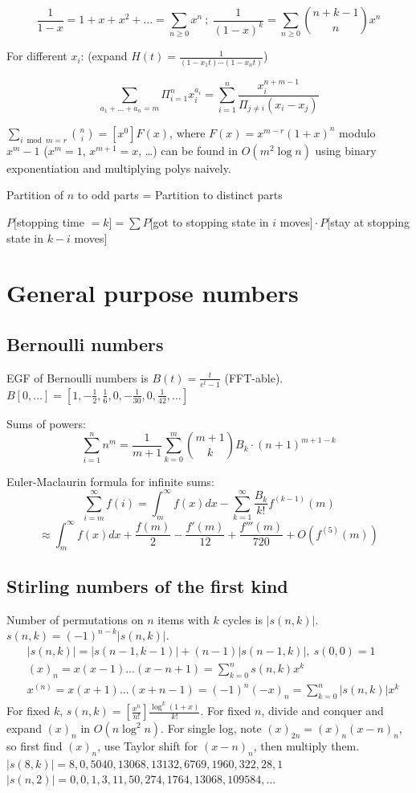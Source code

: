 	$$ \frac{1}{1-x} = 1+x+x^2+\ldots = \sum_{n \ge 0} x^n \ ;\ \frac{1}{(1-x)^k} = \sum_{n \ge 0} \binom{n+k-1}{n} x^n $$

	For different $x_i$: (expand $H(t)=\frac{1}{(1-x_1 t)\cdots (1-x_n t)}$)

	$$ \sum_{a_1+\ldots+a_n=m} \Pi_{i=1}^n x_i ^ {a_i} = \sum_{i=1}^n \frac{x_i ^ {n+m-1}}{\Pi_{j \neq i} (x_i-x_j)} $$

	$\sum_{i \bmod m = r}\binom{n}{i}=[x^0]F(x)$, where $F(x)=x^{m-r}(1+x)^n$ modulo $x^m-1$ ($x^m=1$, $x^{m+1}=x$, \ldots) can be found in $O(m^2 \log n)$ using binary exponentiation and multiplying polys naively.

	Partition of $n$ to odd parts = Partition to distinct parts

	$P[$stopping time $= k] = \sum P[$got to stopping state in $i$ moves$]\cdot P[$stay at stopping state in $k-i$ moves$]$

\columnbreak

\section{General purpose numbers}
	\subsection{Bernoulli numbers}
		EGF of Bernoulli numbers is $B(t)=\frac{t}{e^t-1}$ (FFT-able).
		$B[0,\ldots] = [1, -\frac{1}{2}, \frac{1}{6}, 0, -\frac{1}{30}, 0, \frac{1}{42}, \ldots]$

		Sums of powers:
		\small
		\[ \sum_{i=1}^n n^m = \frac{1}{m+1} \sum_{k=0}^m \binom{m+1}{k} B_k \cdot (n+1)^{m+1-k} \]
		\normalsize

		Euler-Maclaurin formula for infinite sums:
		\small
		\[ \sum_{i=m}^{\infty} f(i) = \int_m^\infty f(x) dx - \sum_{k=1}^\infty \frac{B_k}{k!}f^{(k-1)}(m) \]
		\[ \approx \int_{m}^\infty f(x)dx + \frac{f(m)}{2} - \frac{f'(m)}{12} + \frac{f'''(m)}{720} + O(f^{(5)}(m)) \]
		\normalsize

	\subsection{Stirling numbers of the first kind}
		Number of permutations on $n$ items with $k$ cycles is $|s(n,k)|$.
		$s(n,k)=(-1)^{n-k}|s(n,k)|$.
		\begin{align*}
			&|s(n,k)| = |s(n-1,k-1)| + (n-1) |s(n-1,k)|,\ s(0,0) = 1 \\
			&\textstyle (x)_n = x(x-1) \dots (x-n+1) = \sum_{k=0}^n s(n,k)x^k \\
			&\textstyle x^{(n)} = x(x+1) \dots (x+n-1) = (-1)^n(-x)_n = \sum_{k=0}^n |s(n,k)|x^k
		\end{align*}
		For fixed $k$, $s(n,k) = [\frac{x^n}{n!}]\frac{\log^k (1+x)}{k!}$. 
		For fixed $n$, divide and conquer and expand $(x)_n$ in $O(n \log^2 n)$. 
		For single log, note $(x)_{2n}=(x)_n(x-n)_n$, so first find $(x)_n$, 
		use Taylor shift for $(x-n)_n$, then multiply them.
		$|s(8,k)| = 8, 0, 5040, 13068, 13132, 6769, 1960, 322, 28, 1$ \\
		$|s(n,2)| = 0, 0, 1, 3, 11, 50, 274, 1764, 13068, 109584, \dots$

